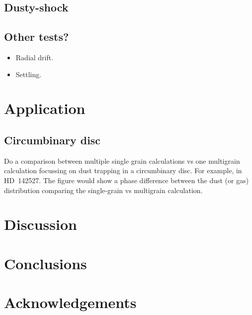 \documentclass[fleqn,usenatbib]{mnras}
\begin{document}
\subsection{Dusty-shock}

\subsection{Other tests?}

\begin{itemize}
   \item Radial drift.
   \item Settling.
\end{itemize}

\section{Application}

\subsection{Circumbinary disc}

Do a comparison between multiple single grain calculations vs one multigrain
calculation focussing on dust trapping in a circumbinary disc. For example, in
HD~142527. The figure would show a phase difference between the dust (or gas)
distribution comparing the single-grain vs multigrain calculation.

\section{Discussion}

\section{Conclusions}

\section*{Acknowledgements}
















\bsp %
\label{lastpage}
\end{document}
